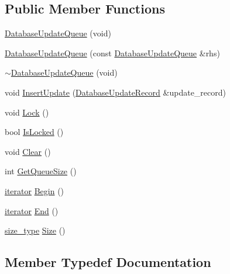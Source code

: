\subsection*{Public Member Functions}
\begin{DoxyCompactItemize}
\item 
\hyperlink{class_n_m_1_1_o_d_b_1_1_database_update_queue_a53aee55e64568b652228f07a3328c0b4}{Database\+Update\+Queue} (void)
\item 
\hyperlink{class_n_m_1_1_o_d_b_1_1_database_update_queue_a6991cbfec3d4bd69e521d0aeac00256e}{Database\+Update\+Queue} (const \hyperlink{class_n_m_1_1_o_d_b_1_1_database_update_queue}{Database\+Update\+Queue} \&rhs)
\item 
\hyperlink{class_n_m_1_1_o_d_b_1_1_database_update_queue_a10c4fb2d1024ddb81ff46915f7204274}{$\sim$\+Database\+Update\+Queue} (void)
\item 
void \hyperlink{class_n_m_1_1_o_d_b_1_1_database_update_queue_ac45bbcc2e9fa0982b92dc1a07936c611}{Insert\+Update} (\hyperlink{class_n_m_1_1_o_d_b_1_1_database_update_record}{Database\+Update\+Record} \&update\+\_\+record)
\item 
void \hyperlink{class_n_m_1_1_o_d_b_1_1_database_update_queue_aa3eb3ca84792c938b6301b2d7e2ee6e9}{Lock} ()
\item 
bool \hyperlink{class_n_m_1_1_o_d_b_1_1_database_update_queue_a6a6c978a185e3b57abd5505518a44913}{Is\+Locked} ()
\item 
void \hyperlink{class_n_m_1_1_o_d_b_1_1_database_update_queue_a2665795812f2709d61f5a12ce813c063}{Clear} ()
\item 
int \hyperlink{class_n_m_1_1_o_d_b_1_1_database_update_queue_a40c3037ec070e8047091b7000e07cbe1}{Get\+Queue\+Size} ()
\item 
\hyperlink{class_n_m_1_1_o_d_b_1_1_database_update_queue_1_1iterator}{iterator} \hyperlink{class_n_m_1_1_o_d_b_1_1_database_update_queue_af199902f2ccc0435cb3ccd279964730a}{Begin} ()
\item 
\hyperlink{class_n_m_1_1_o_d_b_1_1_database_update_queue_1_1iterator}{iterator} \hyperlink{class_n_m_1_1_o_d_b_1_1_database_update_queue_a32679f2ab7a81338eb1852a15b844eca}{End} ()
\item 
\hyperlink{class_n_m_1_1_o_d_b_1_1_database_update_queue_a4a9f68d39b323a940c57db62b8f51506}{size\+\_\+type} \hyperlink{class_n_m_1_1_o_d_b_1_1_database_update_queue_ae40185ad2cae4e8a1def540e9957526d}{Size} ()
\end{DoxyCompactItemize}


\subsection{Member Typedef Documentation}
\hypertarget{class_n_m_1_1_o_d_b_1_1_database_update_queue_a4a9f68d39b323a940c57db62b8f51506}{}
